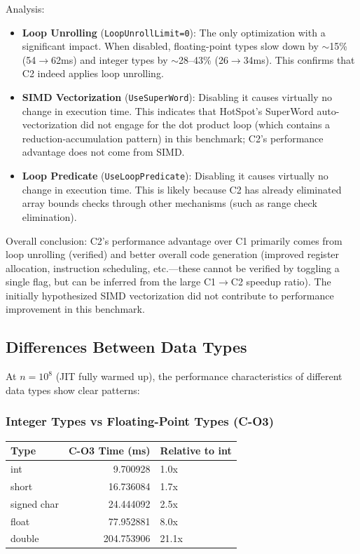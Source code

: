 \documentclass[12pt,a4paper]{article}
\begin{document}
Analysis:
\begin{itemize}
  \item \textbf{Loop Unrolling} (\texttt{LoopUnrollLimit=0}): The only optimization with a significant impact. When disabled, floating-point types slow down by ${\sim}$15\% (54$\to$62ms) and integer types by ${\sim}$28--43\% (26$\to$34ms). This confirms that C2 indeed applies loop unrolling.
  \item \textbf{SIMD Vectorization} (\texttt{UseSuperWord}): Disabling it causes virtually no change in execution time. This indicates that HotSpot's SuperWord auto-vectorization did not engage for the dot product loop (which contains a reduction-accumulation pattern) in this benchmark; C2's performance advantage does not come from SIMD.
  \item \textbf{Loop Predicate} (\texttt{UseLoopPredicate}): Disabling it causes virtually no change in execution time. This is likely because C2 has already eliminated array bounds checks through other mechanisms (such as range check elimination).
\end{itemize}

Overall conclusion: C2's performance advantage over C1 primarily comes from loop unrolling (verified) and better overall code generation (improved register allocation, instruction scheduling, etc.---these cannot be verified by toggling a single flag, but can be inferred from the large C1$\to$C2 speedup ratio). The initially hypothesized SIMD vectorization did not contribute to performance improvement in this benchmark.

\subsection{Differences Between Data Types}

At $n=10^8$ (JIT fully warmed up), the performance characteristics of different data types show clear patterns:

\subsubsection*{Integer Types vs Floating-Point Types (C-O3)}

\begin{table}[H]
\centering
\begin{tabular}{l r l}
\toprule
Type & C-O3 Time (ms) & Relative to int \\
\midrule
int         & 9.700928    & 1.0x  \\
short       & 16.736084   & 1.7x  \\
signed char & 24.444092   & 2.5x  \\
float       & 77.952881   & 8.0x  \\
double      & 204.753906  & 21.1x \\
\bottomrule
\end{tabular}
\end{table}
\end{document}
